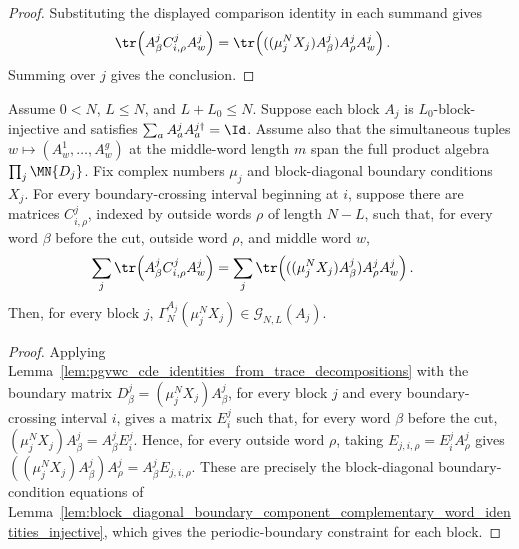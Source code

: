 \begin{proof}
    \leanok
    Substituting the displayed comparison identity in each summand gives
    \begin{align}
        \tr\!\left(A^j_\beta C^j_{i,\rho}A^j_w\right)
         & =
        \tr\!\left(((\mu_j^NX_j)A^j_\beta)A^j_\rho A^j_w\right).
        \notag
    \end{align}
    Summing over $j$ gives the conclusion.
\end{proof}

\begin{lemma}
    \label{lem:block_diagonal_boundary_component_trace_decomposition_injective}
    \leanok
    Assume $0<N$, $L\le N$, and $L+L_0\le N$. Suppose each block $A_j$
    is $L_0$-block-injective and satisfies
    $\sum_a A^j_aA^{j\dagger}_a=\Id$. Assume also that the simultaneous tuples
    $w\mapsto(A^1_w,\ldots,A^g_w)$ at the middle-word length $m$ span the full
    product algebra $\prod_j\MN{D_j}$. Fix complex numbers $\mu_j$ and
    block-diagonal boundary conditions $X_j$. For every boundary-crossing
    interval beginning at $i$, suppose there are matrices $C^j_{i,\rho}$,
    indexed by outside words $\rho$ of length $N-L$, such that, for every word
    $\beta$ before the cut, outside word $\rho$, and middle word $w$,
    \begin{align}
        \sum_j\tr\!\left(A^j_\beta C^j_{i,\rho}A^j_w\right)
         & =
        \sum_j
        \tr\!\left(((\mu_j^NX_j)A^j_\beta)A^j_\rho A^j_w\right).
        \notag
    \end{align}
    Then, for every block $j$,
    $\Gamma_N^{A_j}(\mu_j^NX_j) \in \mathcal G_{N,L}(A_j)$.
\end{lemma}

\begin{proof}
    \leanok
    Applying
    Lemma~\ref{lem:pgvwc_cde_identities_from_trace_decompositions}
    with the boundary matrix $D^j_\beta=(\mu_j^NX_j)A^j_\beta$, for every
    block $j$ and every boundary-crossing interval $i$, gives a matrix
    $E^j_i$ such that, for every word $\beta$ before the cut,
    $(\mu_j^NX_j)A^j_\beta = A^j_\beta E^j_i$.
    Hence, for every outside word $\rho$, taking
    $E_{j,i,\rho}=E^j_iA^j_\rho$ gives
    $((\mu_j^NX_j)A^j_\beta)A^j_\rho = A^j_\beta E_{j,i,\rho}$.
    These are precisely the block-diagonal boundary-condition equations of
    Lemma~\ref{lem:block_diagonal_boundary_component_complementary_word_identities_injective},
    which gives the periodic-boundary constraint for each block.
\end{proof}

